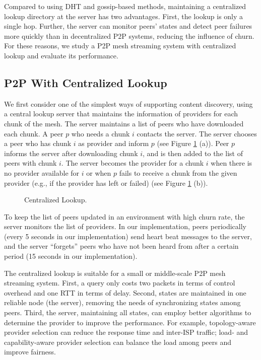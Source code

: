     Compared to using DHT and gossip-based methods, maintaining 
    a centralized lookup directory at the server has two 
    advantages.  First, the lookup is only a single hop.  Further,
    the server can monitor peers' states and detect peer 
    failures more quickly than in decentralized P2P systems, 
    reducing the influence of churn.
    For these reasons, we study a P2P
    mesh streaming system with centralized lookup and evaluate its performance.

\subsection{P2P With Centralized Lookup}
\label{s:cp2p}

    We first consider one of the simplest ways of supporting content discovery,
    using a central lookup server that maintains the information of providers 
    for each chunk of the mesh. 
    The server maintains a list of peers who have downloaded each chunk.
    A peer $p$ who needs a chunk $i$ contacts the server.  The server
    chooses a peer who has chunk $i$ as provider and inform $p$ (see
    Figure \ref{f:cp2p} (a)).  Peer $p$
    informs the server after downloading chunk $i$, and is then added to the
    list of peers with chunk $i$.
    The server becomes the provider for a chunk $i$ when there is no 
    provider available for $i$ or when $p$ fails to receive a chunk from the
    given provider (e.g., if the provider has left or failed)
    (see Figure \ref{f:cp2p} (b)).

   \begin{figure}[t]
    \centering
    \caption{Centralized Lookup. 
    \label{f:cp2p}}
    \end{figure}

    To keep the list of peers updated in an environment with high
    churn rate,  the server monitors
    the list of providers. %
    In our implementation, peers periodically (every 5 seconds in our
    implementation) send
    heart beat messages to the server, and the server 
    ``forgets'' peers who have not been heard from after a certain
    period (15 seconds in our implementation).

    The centralized lookup is suitable for a small or middle-scale 
    P2P mesh streaming system.
    First, a query only costs two packets in terms of control overhead and 
    one RTT in terms of delay.
    Second, 
    states are maintained in one reliable
    node (the server), removing the needs of synchronizing states among
    peers. 
    Third, the server, maintaining all states, can employ better %
    algorithms to determine the provider to improve the performance. 
    For example, topology-aware provider selection can 
    reduce the response time and inter-ISP traffic; load- and capability-aware 
	provider selection can balance the load among peers and improve fairness.
    
